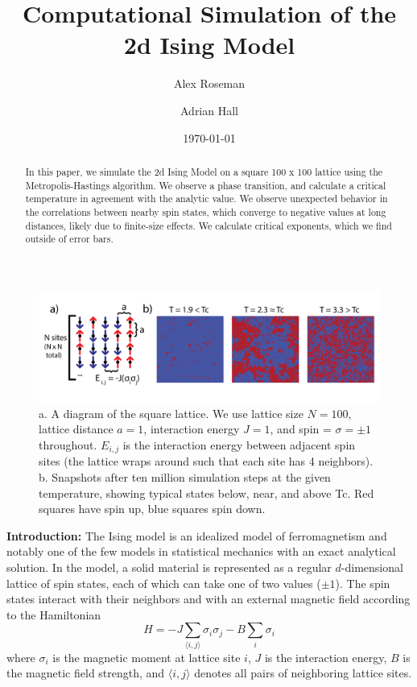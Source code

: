 \documentclass[letter,scriptaddress,twocolumn, prl,nofootinbib]{revtex4}
\begin{document}
\title{Computational Simulation of the 2d Ising Model}

\author{Alex Roseman}
\author{Adrian Hall}
\date{\today}

\begin{abstract}
In this paper, we simulate the 2d Ising Model on a square 100 x 100 lattice using the Metropolis-Hastings algorithm. We observe a phase transition, and calculate a critical temperature in agreement with the analytic value. We observe unexpected behavior in the correlations between nearby spin states, which converge to negative values at long distances, likely due to finite-size effects. We calculate critical exponents, which we find outside of error bars.
\end{abstract}

\maketitle

\begin{figure}[t]
	\begin{center}
		\includegraphics[width=1\textwidth]{figs/fig1.png}
		\caption{a. A diagram of the square lattice. We use lattice size $N = 100$, lattice distance $a = 1$, interaction energy $J = 1$, and spin = $\sigma = \pm 1$ throughout. $E_{i, j}$ is the interaction energy between adjacent spin sites (the lattice wraps around such that each site has 4 neighbors). b. Snapshots after ten million simulation steps at the given temperature, showing typical states below, near, and above Tc. Red squares have spin up, blue squares spin down.}
		\label{fig:fig1}
	\end{center}
\end{figure}

\textbf{Introduction:} The Ising model is an idealized model of ferromagnetism and notably one of the few models in statistical mechanics with an exact analytical solution. In the model, a solid material is represented as a regular $d$-dimensional lattice of spin states, each of which can take one of two values ($\pm 1$). The spin states interact with their neighbors and with an external magnetic field according to the Hamiltonian
\begin{equation}
	\label{eq:hamiltonian}
	H = -J \sum_{\langle i, j \rangle} \sigma_i \sigma_j - B \sum_i \sigma_i
\end{equation}
where $\sigma_i$ is the magnetic moment at lattice site $i$, $J$ is the interaction energy, $B$ is the magnetic field strength, and $\langle i, j \rangle$ denotes all pairs of neighboring lattice sites.
\end{document}
